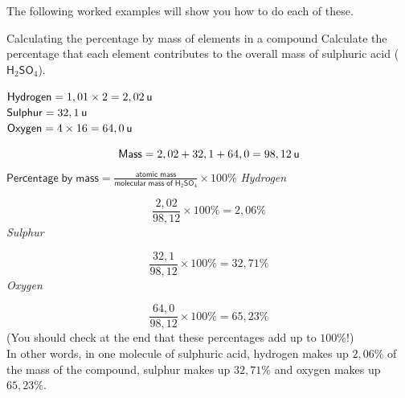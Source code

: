 The following worked examples will show you how to do each of these.
\par
            \label{m38712*secfhsst!!!underscore!!!id901}\vspace{.5cm} 
      \noindent
      \begin{wex}{Calculating the percentage by mass of elements in a compound }
{
      \label{m38712*probfhsst!!!underscore!!!id902}
      \label{m38712*id280520}Calculate the percentage that each element contributes to the overall mass of sulphuric acid (${\mathsf{H}}_{2}{\mathsf{SO}}_{4}$).
      \vspace{5pt}}
{
      \label{m38712*id280575}$\mathsf{Hydrogen}=1,01\ensuremath{\times}2=2,02\phantom{\rule{2pt}{0ex}}\mathsf{u}$ \\ 
      \label{m38712*id280588}$\mathsf{Sulphur}=32,1\phantom{\rule{2pt}{0ex}}\mathsf{u}$ \\
      \label{m38712*id280591}$\mathsf{Oxygen}=4\ensuremath{\times}16=64,0\phantom{\rule{2pt}{0ex}}\mathsf{u}$
      \label{m38712*id280629}\nopagebreak\noindent{}
        
    \begin{equation*}
    \mathsf{Mass}=2,02 + 32,1 + 64,0 =98,12\phantom{\rule{2pt}{0ex}}\mathsf{u}
      \end{equation*}
      \label{m38712*id280688}$\mathsf{Percentage\; by\; mass}=\frac{\mathsf{atomic\; mass}}{\mathsf{molecular\; mass\; of\; H}{}_{2}\mathsf{SO}{}_{4}}\ensuremath{\times}100\%$ 
      \label{m38712*id280729}
        \textsl{Hydrogen}
      
      \label{m38712*id280735}\nopagebreak\noindent{}
        
    \begin{equation*}
    \frac{2,02}{98,12}\ensuremath{\times}100\%=2,06\%
      \end{equation*}
      \label{m38712*id280780}
        \textsl{Sulphur}
      
      \label{m38712*id280786}\nopagebreak\noindent{}
        
    \begin{equation*}
    \frac{32,1}{98,12}\ensuremath{\times}100\%=32,71\%
      \end{equation*}
      \label{m38712*id280831}
        \textsl{Oxygen}
      
      \label{m38712*id280837}\nopagebreak\noindent{}
        
    \begin{equation*}
    \frac{64,0}{98,12}\ensuremath{\times}100\%=65,23\%
      \end{equation*}
      \label{m38712*id280876}(You should check at the end that these percentages add up to $100\%$!) \\
      \label{m38712*id280880}In other words, in one molecule of sulphuric acid, hydrogen makes up $2,06\%$ of the mass of the compound, sulphur makes up $32,71\%$ and oxygen makes up $65,23\%$. 
}
    \end{wex}
